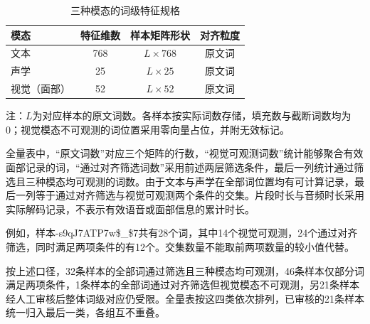 \begin{table}[H]
    \centering\small
    \caption{三种模态的词级特征规格}
    \label{tab:p1_feature_specification}
    \setlength{\tabcolsep}{6pt}
    \renewcommand{\arraystretch}{1.12}
    \ifdefined\pOneCompactTableBox\else\newsavebox{\pOneCompactTableBox}\fi
    \begin{lrbox}{\pOneCompactTableBox}
    \begin{tabular}{lccc}
        \toprule
        模态 & 特征维数 & 样本矩阵形状 & 对齐粒度\\
        \midrule
        文本 & 768 & $L\times768$ & 原文词\\
        声学 & 25 & $L\times25$ & 原文词\\
        视觉（面部） & 52 & $L\times52$ & 原文词\\
        \bottomrule
    \end{tabular}
    \end{lrbox}
    \usebox{\pOneCompactTableBox}
\par\smallskip
\parbox{\wd\pOneCompactTableBox}{\footnotesize 注：$L$为对应样本的原文词数。各样本按实际词数存储，填充数与截断词数均为0；视觉模态不可观测的词位置采用零向量占位，并附无效标记。}
\end{table}

全量表中，“原文词数”对应三个矩阵的行数，“视觉可观测词数”统计能够聚合有效面部记录的词，“通过对齐筛选词数”采用前述两层筛选条件，最后一列统计通过筛选且三种模态均可观测的词数。由于文本与声学在全部词位置均有可计算记录，最后一列等于通过对齐筛选与视觉可观测两个条件的交集。片段时长与音频时长采用实际解码记录，不表示有效语音或面部信息的累计时长。

例如，样本-s9qJ7ATP7w\$\_\$7共有28个词，其中14个视觉可观测，24个通过对齐筛选，同时满足两项条件的有12个。交集数量不能取前两项数量的较小值代替。

按上述口径，32条样本的全部词通过筛选且三种模态均可观测，46条样本仅部分词满足两项条件，1条样本的全部词通过对齐筛选但视觉模态不可观测，另21条样本经人工审核后整体词级对应仍受限。全量表按这四类依次排列，已审核的21条样本统一归入最后一类，各组互不重叠。

